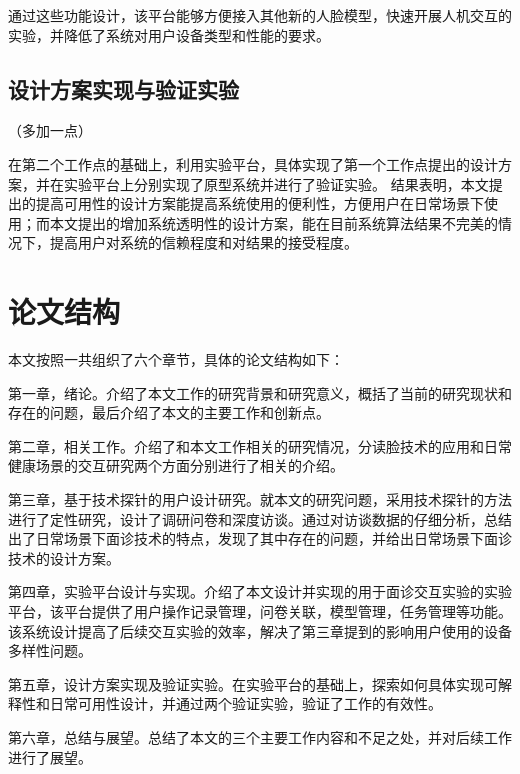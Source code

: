 通过这些功能设计，该平台能够方便接入其他新的人脸模型，快速开展人机交互的实验，并降低了系统对用户设备类型和性能的要求。


\subsection{设计方案实现与验证实验}（多加一点）

在第二个工作点的基础上，利用实验平台，具体实现了第一个工作点提出的设计方案，并在实验平台上分别实现了原型系统并进行了验证实验。
结果表明，本文提出的提高可用性的设计方案能提高系统使用的便利性，方便用户在日常场景下使用；而本文提出的增加系统透明性的设计方案，能在目前系统算法结果不完美的情况下，提高用户对系统的信赖程度和对结果的接受程度。


\section{论文结构}
本文按照一共组织了六个章节，具体的论文结构如下：

第一章，绪论。介绍了本文工作的研究背景和研究意义，概括了当前的研究现状和存在的问题，最后介绍了本文的主要工作和创新点。

第二章，相关工作。介绍了和本文工作相关的研究情况，分读脸技术的应用和日常健康场景的交互研究两个方面分别进行了相关的介绍。

第三章，基于技术探针的用户设计研究。就本文的研究问题，采用技术探针的方法进行了定性研究，设计了调研问卷和深度访谈。通过对访谈数据的仔细分析，总结出了日常场景下面诊技术的特点，发现了其中存在的问题，并给出日常场景下面诊技术的设计方案。

第四章，实验平台设计与实现。介绍了本文设计并实现的用于面诊交互实验的实验平台，该平台提供了用户操作记录管理，问卷关联，模型管理，任务管理等功能。该系统设计提高了后续交互实验的效率，解决了第三章提到的影响用户使用的设备多样性问题。

第五章，设计方案实现及验证实验。在实验平台的基础上，探索如何具体实现可解释性和日常可用性设计，并通过两个验证实验，验证了工作的有效性。

第六章，总结与展望。总结了本文的三个主要工作内容和不足之处，并对后续工作进行了展望。